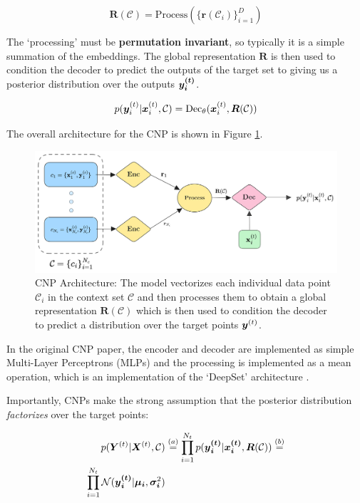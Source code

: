 \documentclass[../../main.tex]{subfiles}
\begin{document}
\begin{equation}
    \bm{R}(\mathcal{C}) = \text{Process}(\{ \bm{r}(\mathcal{C}_i) \}_{i=1}^D)
\end{equation}

The `processing' must be \textbf{permutation invariant}, so typically it is a simple summation of the embeddings. The global representation $\bm{R}$ is then used to condition the decoder to predict the outputs of the target set to giving us a posterior distribution over the outputs $\bm{y_i^{(t)}}$.

\begin{equation}
    p(\bm{y}_i^{(t)} | \bm{x}_i^{(t)}, \mathcal{C}) = \text{Dec}_\theta(\bm{x}_i^{(t)}, \bm{R}(\mathcal{C}))
\end{equation}

The overall architecture for the CNP is shown in Figure \ref{fig:cnp-architecture}.

\begin{figure}[H]
	\centering
	\includegraphics[height=0.3\textwidth]{./cnp.png}
	\caption{CNP Architecture: The model vectorizes each individual data point $\mathcal{C}_i$ in the context set $\mathcal{C}$ and then processes them to obtain a global representation $\bm{R}(\mathcal{C})$ which is then used to condition the decoder to predict a distribution over the target points $\bm{y}^{(t)}$.}
    \label{fig:cnp-architecture}
\end{figure}


In the original CNP paper, the encoder and decoder are implemented as simple Multi-Layer Perceptrons (MLPs) and the processing is implemented as a mean operation, which is an implementation of the `DeepSet' architecture \cite{zaheer2018deep}.


Importantly, CNPs make the strong assumption that the posterior distribution \emph{factorizes} over the target points:

\begin{align}
    p(\bm{Y}^{(t)} | \bm{X}^{(t)}, \mathcal{C}) &\stackrel{(a)}{=} \prod_{i=1}^{N_t} p(\bm{{y}_i^{(t)}} | \bm{{x}_i^{(t)}}, \bm{R}(\mathcal{C}))  \stackrel{(b)}{=}\\
    \prod_{i=1}^{N_t} \mathcal{N}(\bm{{y}_i^{(t)}} | \bm{\mu_i}, \bm{\sigma_i}^2) 
\end{align}
\end{document}
